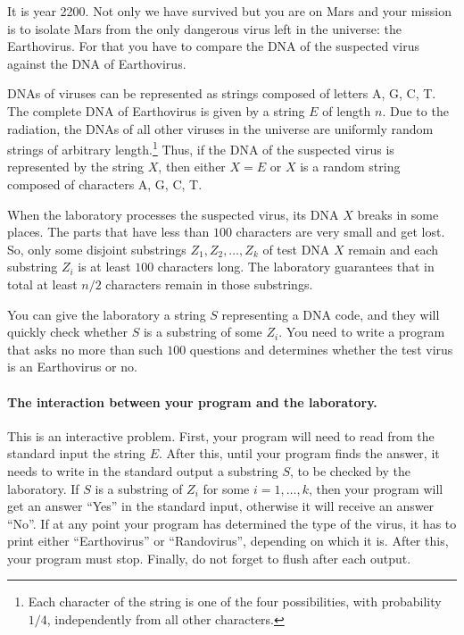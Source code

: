 It is year 2200.
Not only we have survived but you are on Mars and your mission is to isolate Mars from the only dangerous virus left in the universe: the Earthovirus.
For that you have to compare the DNA of the suspected virus against the DNA of Earthovirus.

DNAs of viruses can be represented as strings composed of letters A, G, C, T.
The complete DNA of Earthovirus is given by a string $E$ of length $n$.
Due to the radiation, the DNAs of all other viruses in the universe are uniformly random strings of arbitrary length.\footnote{Each character of the string is one of the four possibilities, with probability $1/4$, independently from all other characters.}
Thus, if the DNA of the suspected virus is represented by the string $X$, then either $X = E$ or $X$ is a random string composed of characters A, G, C, T.

When the laboratory processes the suspected virus, its DNA $X$ breaks in some places. %
The parts that have less than $100$ characters are very small and get lost.
So, only some disjoint substrings $Z_1, Z_2, \dots, Z_k$ of test DNA $X$ remain and each substring $Z_i$ is at least $100$ characters long.
The laboratory guarantees that in total at least $n / 2$ characters remain in those substrings.

You can give the laboratory a string $S$ representing a DNA code, and they will quickly check whether $S$ is a substring of some $Z_i$.
You need to write a program that asks no more than such $100$ questions and determines whether the test virus is an Earthovirus or no.

\paragraph{The interaction between your program and the laboratory.}
This is an interactive problem.
First, your program will need to read from the standard input the string $E$.
After this, until your program finds the answer, it needs to write in the standard output a substring $S$, to be checked by the laboratory.
If $S$ is a substring of $Z_i$ for some $i = 1, \dots, k$, then your program will get an answer ``Yes'' in the standard input, otherwise it will receive an answer ``No''.
If at any point your program has determined the type of the virus, it has to print either ``Earthovirus'' or ``Randovirus'', depending on which it is.
After this, your program must stop.
Finally, do not forget to flush after each output.

